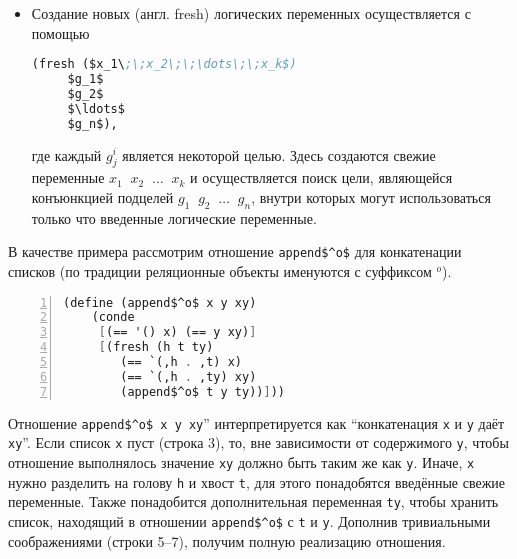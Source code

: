 \begin{itemize}
\item Создание новых (англ. fresh) логических переменных осуществляется с помощью

\begin{lstlisting}[language=scheme]
   (fresh ($x_1\;\;x_2\;\;\dots\;\;x_k$)
     $g_1$
     $g_2$
     $\ldots$
     $g_n$),
\end{lstlisting}

где каждый $g^i_j$ является некоторой целью. Здесь создаются свежие переменные  $x_1\;\;x_2\;\;\dots\;\;x_k$ и
осуществляется поиск цели, являющейся конъюнкцией подцелей $g_1\;\;g_2\;\;\dots\;\;g_n$, внутри которых могут использоваться только что введенные логические переменные.
\end{itemize}

В качестве примера рассмотрим отношение  \lstinline|append$^o$| для конкатенации списков (по традиции реляционные объекты именуются с суффиксом $^o$).

\begin{lstlisting}[mathescape=true,language=scheme,numbers=left,numberstyle=\small,stepnumber=1,numbersep=-5pt]
  (define (append$^o$ x y xy)
    (conde
     [(== '() x) (== y xy)]
     [(fresh (h t ty)
        (== `(,h . ,t) x)
        (== `(,h . ,ty) xy)
        (append$^o$ t y ty))]))
\end{lstlisting}

Отношение \lstinline|append$^o$ x y xy|'' интерпретируется как ``конкатенация  \lstinline|x| и \lstinline|y| даёт \lstinline|xy|''.
Если список \lstinline|x| пуст (строка 3), то, вне зависимости от содержимого \lstinline|y|, чтобы отношение выполнялось значение \lstinline|xy| должно быть таким же как \lstinline|y|.
Иначе, \lstinline|x| нужно разделить на голову \lstinline|h| и хвост \lstinline|t|, для этого понадобятся введённые свежие переменные.
Также понадобится дополнительная переменная \lstinline|ty|, чтобы хранить список, находящий в отношении \lstinline|append$^o$| с \lstinline|t| и \lstinline|y|.
Дополнив тривиальными соображениями (строки 5--7), получим полную реализацию отношения.


